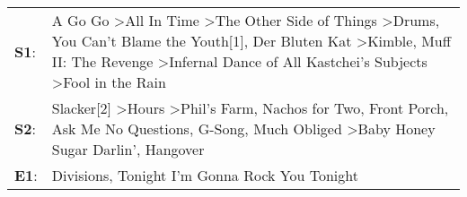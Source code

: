 \begin{supertabular}{p{0.03\textwidth}p{0.92\textwidth}}
 \textbf{S1}:  &  A Go Go\textsuperscript{} \textgreater \enspace All In Time\textsuperscript{} \textgreater \enspace The Other Side of Things\textsuperscript{} \textgreater \enspace Drums\textsuperscript{}, \enspace You Can't Blame the Youth[1]\textsuperscript{}, \enspace Der Bluten Kat\textsuperscript{} \textgreater \enspace Kimble\textsuperscript{}, \enspace Muff II: The Revenge\textsuperscript{} \textgreater \enspace Infernal Dance of All Kastchei's Subjects\textsuperscript{} \textgreater \enspace Fool in the Rain\textsuperscript{}  \enspace  \\
 \textbf{S2}:  &                                                                                          Slacker[2]\textsuperscript{} \textgreater \enspace Hours\textsuperscript{} \textgreater \enspace Phil's Farm\textsuperscript{}, \enspace Nachos for Two\textsuperscript{}, \enspace Front Porch\textsuperscript{}, \enspace Ask Me No Questions\textsuperscript{}, \enspace G-Song\textsuperscript{}, \enspace Much Obliged\textsuperscript{} \textgreater \enspace Baby Honey Sugar Darlin'\textsuperscript{}, \enspace Hangover\textsuperscript{}  \enspace  \\
 \textbf{E1}:  &                                                                                                                                                                                                                                                                                                                                                                                                                                                   Divisions\textsuperscript{}, \enspace Tonight I'm Gonna Rock You Tonight\textsuperscript{}  \enspace  \\
\end{supertabular}
